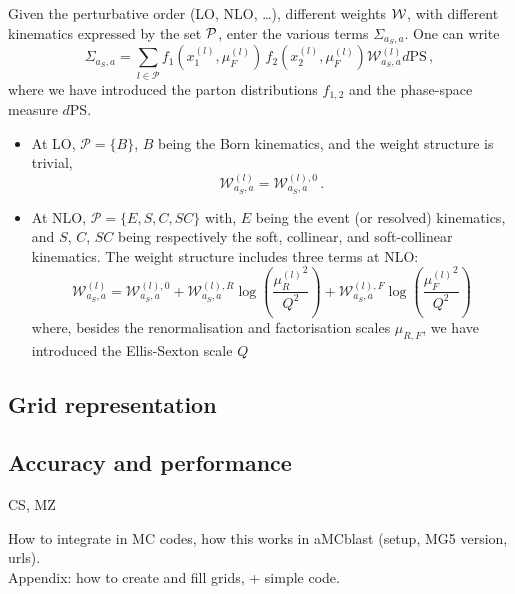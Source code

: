 Given the perturbative order (LO, NLO, \ldots), different weights $\cal W$, with different kinematics expressed by the set $\cal P$, enter the various 
terms $\Sigma_{a_S, a}$. One can write 
\begin{equation}
    \Sigma_{a_S, a}= \sum_{l\in \mathcal P} f_1(x_1^{(l)},\mu_F^{(l)}) \,f_2(x_2^{(l)},\mu_F^{(l)}) \mathcal W^{(l)}_{a_S, a} 
    d \textrm{PS}\,,
\end{equation}
where we have introduced the parton distributions $f_{1,2}$ and the phase-space measure $d$PS.
\begin{itemize}
    \item At LO, $\mathcal P = \{B\}$, $B$ being the Born kinematics, and the weight structure is trivial,
    \begin{equation}
        \mathcal W^{(l)}_{a_S, a} = {\mathcal W^{(l),0}_{a_S, a}}\,.
    \end{equation}
    \item At NLO, $\mathcal P = \{E, S, C, SC\}$ with, $E$ being the event (or resolved) kinematics, and $S$, $C$, $SC$ being
        respectively the soft, collinear, and soft-collinear kinematics. The weight structure includes three terms at NLO:
    \begin{equation}
        \mathcal W^{(l)}_{a_S, a} = {{\mathcal W}^{(l),0}_{a_S, a}} + 
                                {\mathcal W^{(l),R}_{a_S, a}} \log\left(\frac{{\mu_R^{(l)}}^2}{Q^2}\right) + 
                                {\mathcal W^{(l),F}_{a_S, a}} \log\left(\frac{{\mu_F^{(l)}}^2}{Q^2}\right) 
    \end{equation}
    where, besides the renormalisation and factorisation scales $\mu_{R,F}$, we have introduced the Ellis-Sexton scale $Q$
\end{itemize}



\subsection{Grid representation}
\label{sec:grid-representation}

\subsection{Accuracy and performance}
\label{sec:accuracy-and-performance}

CS, MZ

How to integrate in MC codes, how this works in aMCblast (setup, MG5 version, urls).\\
Appendix: how to create and fill grids, + simple code.
